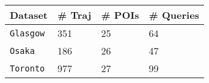 
\begin{table}[t]
		\setlength{\tabcolsep}{4pt} %
		\small
		\begin{tabular}{llll} \hline %
		\textbf{Dataset} & \textbf{\# Traj} & \textbf{\# POIs}  & \textbf{\# Queries} \\ \hline
		{\tt Glasgow}          & 351              & 25              & 64 \\
		{\tt Osaka}            & 186              & 26              & 47 \\
        {\tt Toronto}          & 977              & 27              & 99 \\
		\hline
		\end{tabular}%
		\label{tab:data}
	\vspace{-2\baselineskip}
\end{table}

